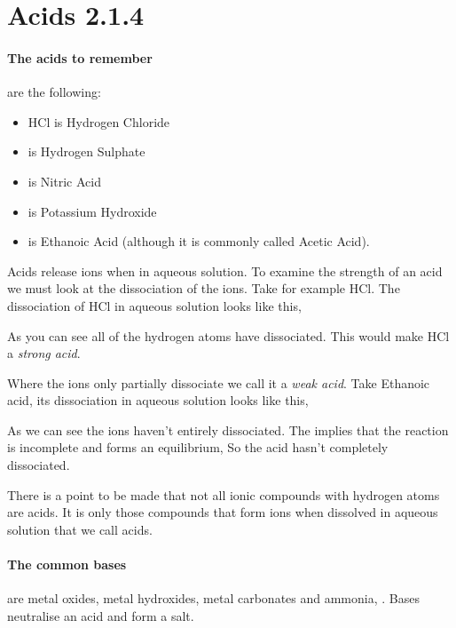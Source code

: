 \section{Acids 2.1.4}

	\paragraph{The acids to remember} are the following:
	\begin{itemize}
		\item HCl is Hydrogen Chloride
		\item {} is Hydrogen Sulphate
		\item {} is Nitric Acid
		\item {} is Potassium Hydroxide
		\item {} is Ethanoic Acid (although it is commonly called Acetic Acid).
	\end{itemize}
    Acids release  ions when in aqueous solution.
	To examine the strength of an acid we must look at the dissociation of the  ions.
	Take for example HCl. The dissociation of HCl in aqueous solution looks like this, 
	\begin{center}
	\end{center}
	As you can see all of the hydrogen atoms have dissociated.
	This would make HCl a \textit{strong acid}. 
	
	Where the  ions only partially dissociate we call it a \textit{weak acid}. Take Ethanoic acid, its dissociation in aqueous solution looks like this, 
	\begin{center}
	\end{center}
	 As we can see the  ions haven't entirely dissociated.
	 The \ch{<=>} implies that the reaction is incomplete and forms an equilibrium, So the acid hasn't completely dissociated.
	
	There is a point to be made that not all ionic compounds with hydrogen atoms are acids.
	It is only those compounds that form  ions when dissolved in aqueous solution that we call acids.
	
	\paragraph{The common bases} are metal oxides, metal hydroxides, metal carbonates and ammonia, .
	Bases neutralise an acid and form a salt.
	
